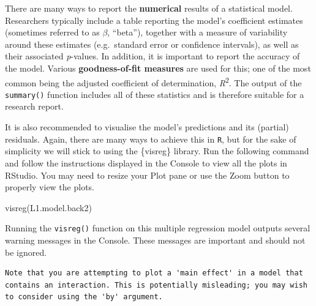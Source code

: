 \documentclass[
  letterpaper,
  DIV=11,
  numbers=noendperiod]{scrreprt}
\newenvironment{Shaded}{\begin{snugshade}}{\end{snugshade}}
\newcommand{\FunctionTok}[1]{\textcolor[rgb]{0.28,0.35,0.67}{#1}}
\newcommand{\NormalTok}[1]{\textcolor[rgb]{0.00,0.23,0.31}{#1}}
\begin{document}
\begin{tcolorbox}[enhanced jigsaw, arc=.35mm, bottomrule=.15mm, bottomtitle=1mm, breakable, colback=white, colbacktitle=quarto-callout-note-color!10!white, colframe=quarto-callout-note-color-frame, coltitle=black, left=2mm, leftrule=.75mm, opacityback=0, opacitybacktitle=0.6, rightrule=.15mm, title=\textcolor{quarto-callout-note-color}{\faInfo}\hspace{0.5em}{How to report a multiple regression model}, titlerule=0mm, toprule=.15mm, toptitle=1mm]

There are many ways to report the \textbf{numerical} results of a
statistical model. Researchers typically include a table reporting the
model's coefficient estimates (sometimes referred to as \(\beta\),
``beta''), together with a measure of variability around these estimates
(e.g.~standard error or confidence intervals), as well as their
associated \emph{p}-values. In addition, it is important to report the
accuracy of the model. Various \textbf{goodness-of-fit measures} are
used for this; one of the most common being the adjusted coefficient of
determination, \emph{R}\textsuperscript{2}. The output of the
\texttt{summary()} function includes all of these statistics and is
therefore suitable for a research report.

It is also recommended to visualise the model's predictions and its
(partial) residuals. Again, there are many ways to achieve this in
\texttt{R}, but for the sake of simplicity we will stick to using the
\{visreg\} library. Run the following command and follow the
instructions displayed in the Console to view all the plots in RStudio.
You may need to resize your Plot pane or use the Zoom button to properly
view the plots.

\begin{Shaded}
\begin{Highlighting}[]
\FunctionTok{visreg}\NormalTok{(L1.model.back2)}
\end{Highlighting}
\end{Shaded}

Running the \texttt{visreg()} function on this multiple regression model
outputs several warning messages in the Console. These messages are
important and should not be ignored.

\begin{verbatim}
Note that you are attempting to plot a 'main effect' in a model that contains an interaction. This is potentially misleading; you may wish to consider using the 'by' argument.
\end{verbatim}


\end{tcolorbox}
\end{document}
